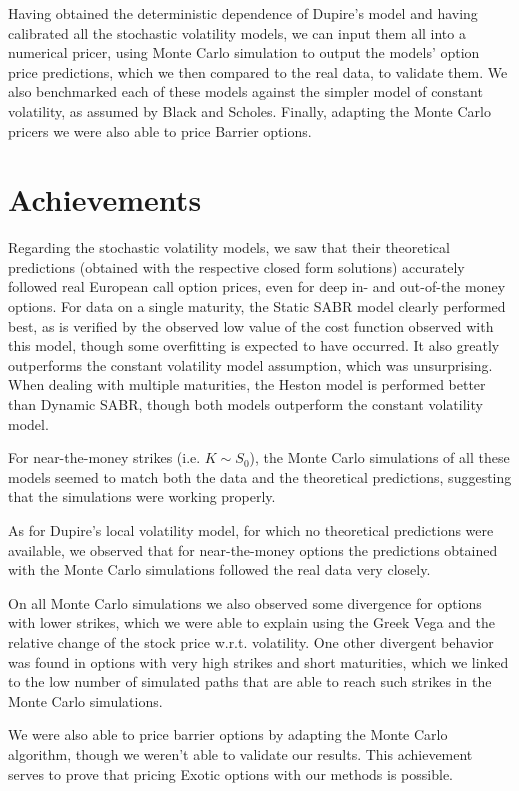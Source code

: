 Having obtained the deterministic dependence of Dupire's model and having calibrated all the stochastic volatility models, we can input them all into a numerical pricer, using Monte Carlo simulation to output the models' option price predictions, which we then compared to the real data, to validate them. We also benchmarked each of these models against the simpler model of constant volatility, as assumed by Black and Scholes.
Finally, adapting the Monte Carlo pricers we were also able to price Barrier options.

\section{Achievements}
Regarding the stochastic volatility models, we saw that their theoretical predictions (obtained with the respective closed form solutions) accurately followed real European call option prices, even for deep in- and out-of-the money options.
For data on a single maturity, the Static SABR model clearly performed best, as is verified by the observed low value of the cost function observed with this model, though some overfitting is expected to have occurred. It also greatly outperforms the constant volatility model assumption, which was unsurprising. When dealing with multiple maturities, the Heston model is performed better than Dynamic SABR, though both models outperform the constant volatility model.

For near-the-money strikes (i.e. $K\sim S_0$), the Monte Carlo simulations of all these models seemed to match both the data and the theoretical predictions, suggesting that the simulations were working properly.

As for Dupire's local volatility model, for which no theoretical predictions were available, we observed that for near-the-money options the predictions obtained with the Monte Carlo simulations followed the real data very closely.

On all Monte Carlo simulations we also observed some divergence for options with lower strikes, which we were able to explain using the Greek Vega and the relative change of the stock price w.r.t. volatility. One other divergent behavior was found in options with very high strikes and short maturities, which we linked to the low number of simulated paths that are able to reach such strikes in the Monte Carlo simulations.

We were also able to price barrier options by adapting the Monte Carlo algorithm, though we weren't able to validate our results. This achievement serves to prove that pricing Exotic options with our methods is possible.

